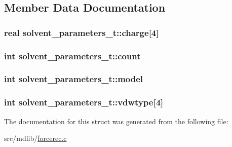 \subsection{\-Member \-Data \-Documentation}
\hypertarget{structsolvent__parameters__t_abad319d772b18384f1bfc6ef1daf505e}{
\subsubsection[{charge}]{\setlength{\rightskip}{0pt plus 5cm}real {\bf solvent\-\_\-parameters\-\_\-t\-::charge}\mbox{[}4\mbox{]}}}\label{structsolvent__parameters__t_abad319d772b18384f1bfc6ef1daf505e}
\hypertarget{structsolvent__parameters__t_a24605e7bd7970c2e70fe1841bc688f93}{
\subsubsection[{count}]{\setlength{\rightskip}{0pt plus 5cm}int {\bf solvent\-\_\-parameters\-\_\-t\-::count}}}\label{structsolvent__parameters__t_a24605e7bd7970c2e70fe1841bc688f93}
\hypertarget{structsolvent__parameters__t_a5ecaff4a91a11e05c4f37e5593be265f}{
\subsubsection[{model}]{\setlength{\rightskip}{0pt plus 5cm}int {\bf solvent\-\_\-parameters\-\_\-t\-::model}}}\label{structsolvent__parameters__t_a5ecaff4a91a11e05c4f37e5593be265f}
\hypertarget{structsolvent__parameters__t_acf48f9e8402d3137ba186df95ce6f257}{
\subsubsection[{vdwtype}]{\setlength{\rightskip}{0pt plus 5cm}int {\bf solvent\-\_\-parameters\-\_\-t\-::vdwtype}\mbox{[}4\mbox{]}}}\label{structsolvent__parameters__t_acf48f9e8402d3137ba186df95ce6f257}


\-The documentation for this struct was generated from the following file\-:\begin{DoxyCompactItemize}
\item 
src/mdlib/\hyperlink{forcerec_8c}{forcerec.\-c}\end{DoxyCompactItemize}
